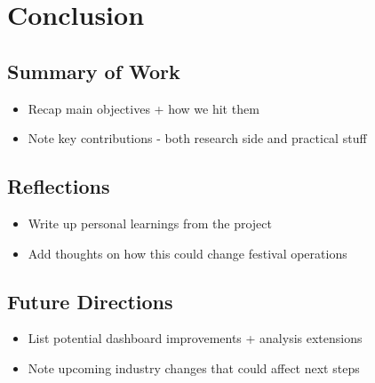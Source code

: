 \chapter{Conclusion}
\label{ch:conclusion}


\section{Summary of Work}
\label{sec:conclusion-summary}
\begin{itemize}
    \item Recap main objectives + how we hit them
    \item Note key contributions - both research side and practical stuff
\end{itemize}


\section{Reflections}
\label{sec:conclusion-reflections}
\begin{itemize}
    \item Write up personal learnings from the project
    \item Add thoughts on how this could change festival operations
\end{itemize}


\section{Future Directions}
\label{sec:conclusion-future-directions}
\begin{itemize}
    \item List potential dashboard improvements + analysis extensions
    \item Note upcoming industry changes that could affect next steps
\end{itemize}